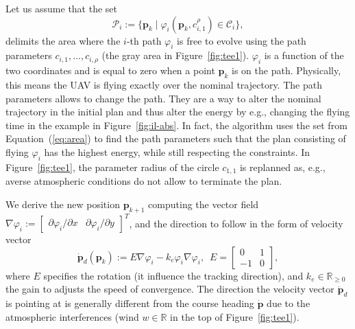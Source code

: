 \documentclass[letterpaper,10pt,conference]{ieeeconf}
\theoremstyle{definition}
\begin{document}

Let us assume that the set
\begin{equation}\label{eq:area}
  \mathcal{P}_i:=\{\mathbf{p}_k\mid\varphi_i(\mathbf{p}_k,c_{i,1}^\rho)\in\mathcal{C}_i\},
\end{equation}
delimits the area where the $i$-th path $\varphi_i$ is free to evolve using the path parameters $c_{i,1},...,c_{i,\rho}$ (the gray area in Figure~\ref{fig:tee1}). $\varphi_i$ is a function of the two coordinates and is equal to zero when a point $\mathbf{p}_k$ is on the path. Physically, this means the UAV is flying exactly over the nominal trajectory. The path parameters allows to change the path. They are a way to alter the nominal trajectory in the initial plan and thus alter the energy by e.g., changing the flying time in the example in Figure~\ref{fig:il-abs}.
In fact, the algorithm uses the set from Equation~(\ref{eq:area}) to find the path parameters such that the plan consisting of flying $\varphi_i$ has the highest energy, while still respecting the constraints. In Figure~\ref{fig:tee1}, the parameter radius of the circle $c_{1,1}$ is replanned as, e.g., averse atmospheric conditions do not allow to terminate the plan.

We derive the new position $\mathbf{p}_{k+1}$ computing the vector field $\nabla\varphi_i:=\begin{bmatrix}\partial\varphi_i/\partial x & \partial\varphi_i/\partial y\end{bmatrix}^T$, and the direction to follow in the form of velocity vector~\cite{de2017guidance}
\begin{equation}\label{eq:pd}
  \dot{\mathbf{p}}_d(\mathbf{p}_k):=E\nabla\varphi_i-k_e\varphi_i\nabla\varphi_i,\,\,\,E=\begin{bmatrix}
    0&1\\-1&0
  \end{bmatrix},
\end{equation}
where $E$ specifies the rotation (it influence the tracking direction), and $k_e\in\mathbb{R}_{\geq 0}$ the gain to adjusts the speed of convergence. The direction the velocity vector $\dot{\mathbf{p}}_d$ is pointing at is generally different from the course heading $\dot{\mathbf{p}}$ due to the atmospheric interferences (wind $w\in\mathbb{R}$ in the top of Figure~\ref{fig:tee1}).
\end{document}
